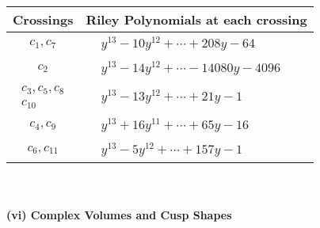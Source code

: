 \documentclass[1p]{elsarticle_modified}
\theoremstyle{definition}
\begin{document}
\begin{tabular}{m{50pt}|m{274pt}}
Crossings & \hspace{64pt}Riley Polynomials at each crossing \\
\hline $$\begin{aligned}c_{1},c_{7}\end{aligned}$$&$\begin{aligned}
&y^{13}-10 y^{12}+\cdots+208 y-64
\end{aligned}$\\
\hline $$\begin{aligned}c_{2}\end{aligned}$$&$\begin{aligned}
&y^{13}-14 y^{12}+\cdots-14080 y-4096
\end{aligned}$\\
\hline $$\begin{aligned}c_{3},c_{5},c_{8}\\c_{10}\end{aligned}$$&$\begin{aligned}
&y^{13}-13 y^{12}+\cdots+21 y-1
\end{aligned}$\\
\hline $$\begin{aligned}c_{4},c_{9}\end{aligned}$$&$\begin{aligned}
&y^{13}+16 y^{11}+\cdots+65 y-16
\end{aligned}$\\
\hline $$\begin{aligned}c_{6},c_{11}\end{aligned}$$&$\begin{aligned}
&y^{13}-5 y^{12}+\cdots+157 y-1
\end{aligned}$\\
\hline
\end{tabular}\\~\\
\newpage\flushleft \textbf{(vi) Complex Volumes and Cusp Shapes}
\end{document}
